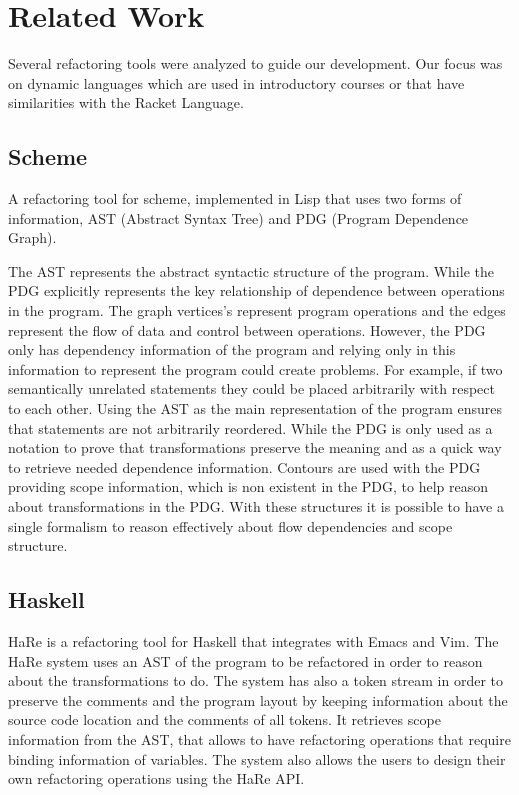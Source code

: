 \section{Related Work}
\label{sec:Related-Work}
Several refactoring tools were analyzed to guide our development.
Our focus was on dynamic languages which are used in introductory courses or that have similarities
with the Racket Language.

\subsection{Scheme}
A refactoring tool \cite{griswold1991program} for scheme, implemented in Lisp that
uses two forms of information, AST (Abstract Syntax Tree) and PDG (Program Dependence Graph).

The AST represents the abstract syntactic structure of the program.
While the PDG explicitly represents the key relationship of dependence between
operations in the program. %
The graph vertices's represent program operations and the edges represent the flow of
data and control between operations.
However, the PDG only has dependency information of the program and relying only
in this information to represent the program could create problems.
For example, if two semantically unrelated statements they could be placed arbitrarily with
respect to each other.
Using the AST as the main representation of the program ensures that statements
are not arbitrarily reordered.
While the PDG is only used as a notation to prove that transformations preserve
the meaning and as a quick way to retrieve needed dependence information.
Contours are used with the PDG providing scope information, which is non existent in the PDG,
to help reason about transformations in the PDG.
With these structures it is possible to have a single formalism to reason effectively
about flow dependencies and scope structure.
\subsection{Haskell}
HaRe \cite{thompson2005refactoring} is a refactoring tool for Haskell that
integrates with Emacs and Vim.
The HaRe system uses an AST of the program to be
refactored in order to reason about the transformations to do.
The system has also a token stream in order to preserve the comments and the
program layout by keeping information about the source code location and the comments of all tokens.
It retrieves scope information from the AST, that allows to have refactoring operations that
require binding information of variables. %
The system also allows the users to design their own refactoring operations
using the HaRe API.
